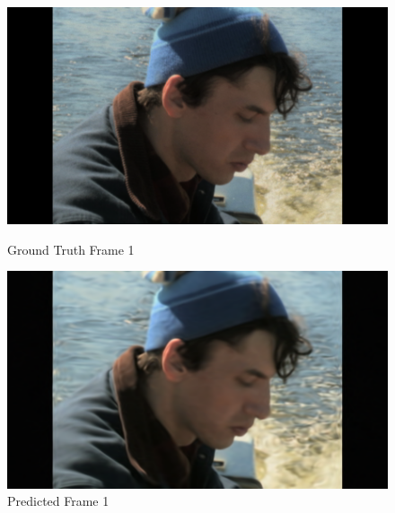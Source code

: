\documentclass{ioereport}
\begin{document}
    \begin{figure}[H]
    \centering
    \begin{minipage}{0.45\textwidth}
        \centering
        \includegraphics[width=\linewidth]{assets/video_results/im1.png}
        \caption{Ground Truth Frame 1}
        \label{fig:gt-frame-1}
    \end{minipage}\hfill
    \begin{minipage}{0.45\textwidth}
        \centering
        \includegraphics[width=\linewidth]{assets/video_results/pred0.png}
        \caption{Predicted Frame 1}
        \label{fig:pred-frame-1}
    \end{minipage}
\end{figure}
\end{document}
